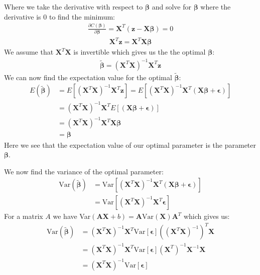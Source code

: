 \documentclass[12pt]{article}
\begin{document}
Where we take the derivative with respect to $\boldsymbol{\beta}$ and solve for $\boldsymbol{\beta}$ where the derivative is 0 to find the minimum:
\begin{align*}
  \frac{\partial C(\boldsymbol{\beta})}{\partial \boldsymbol{\beta}} = \boldsymbol{X}^T (\boldsymbol{z}- \boldsymbol{X}\boldsymbol{\beta}) =0
\end{align*}
\begin{align*}
  \boldsymbol{X}^T\boldsymbol{z} = \boldsymbol{X}^T \boldsymbol{X}\boldsymbol{\beta}
\end{align*}
We assume that $\boldsymbol{X}^T\boldsymbol{X}$ is invertible which gives us the the optimal $\boldsymbol{\beta}$:
\begin{align*}
  \boldsymbol{\tilde{\beta}} = (\boldsymbol{X}^T\boldsymbol{X})^{-1} \boldsymbol{X}^T\boldsymbol{z}
\end{align*}
We can now find the expectation value for the optimal $\boldsymbol{\tilde{\beta}}$:
\begin{align*}
  E(\boldsymbol{\tilde{\beta}}) &= E[(\boldsymbol{X}^T\boldsymbol{X})^{-1} \boldsymbol{X}^T\boldsymbol{z}] = E[(\boldsymbol{X}^T\boldsymbol{X})^{-1} \boldsymbol{X}^T(\boldsymbol{X}\boldsymbol{\beta} + \boldsymbol {\epsilon} )] \\
  &=  (\boldsymbol{X}^T\boldsymbol{X})^{-1} \boldsymbol{X}^TE[(\boldsymbol{X}\boldsymbol{\beta} + \boldsymbol {\epsilon} )] \\ &= (\boldsymbol{X}^T\boldsymbol{X})^{-1} \boldsymbol{X}^T\boldsymbol{X}\boldsymbol{\beta} \\&=  \boldsymbol{\beta}
\end{align*}
Here we see that the expectation value of our optimal parameter is the parameter $\boldsymbol{\beta}$.

We now find the variance of the optimal parameter:
\begin{align*}
  \text{Var}(\boldsymbol{\tilde{\beta}}) &= \text{Var}[(\boldsymbol{X}^T\boldsymbol{X})^{-1} \boldsymbol{X}^T(\boldsymbol{X}\boldsymbol{\beta} + \boldsymbol {\epsilon} )] \\
  &= \text{Var}[(\boldsymbol{X}^T\boldsymbol{X})^{-1} \boldsymbol{X}^T\boldsymbol {\epsilon} ]
\end{align*}
For a matrix $A$ we have Var$(\boldsymbol{AX}+b) = \boldsymbol{A}\text{Var}(\boldsymbol{X})\boldsymbol{A}^T$ which gives us:
\begin{align*}
  \text{Var}(\boldsymbol{\tilde{\beta}})&=(\boldsymbol{X}^T\boldsymbol{X})^{-1}\boldsymbol{X}^T\text{Var}[ {\boldsymbol{\epsilon}} ]((\boldsymbol{X}^T\boldsymbol{X})^{-1})^T\boldsymbol{X} \\  &=
  (\boldsymbol{X}^T\boldsymbol{X})^{-1}\boldsymbol{X}^T\text{Var}[ {\boldsymbol{\epsilon}} ](\boldsymbol{X}^T)^{-1}\boldsymbol{X}^{-1}\boldsymbol{X} \\&=
   (\boldsymbol{X}^T\boldsymbol{X})^{-1}\text{Var}[ {\boldsymbol{\epsilon}} ]
\end{align*}
\end{document}

